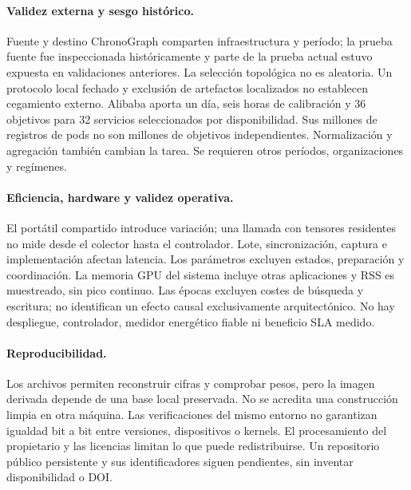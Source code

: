 \paragraph{Validez externa y sesgo histórico.} Fuente y destino ChronoGraph comparten infraestructura y período; la prueba fuente fue inspeccionada históricamente y parte de la prueba actual estuvo expuesta en validaciones anteriores. La selección topológica no es aleatoria. Un protocolo local fechado y exclusión de artefactos localizados no establecen cegamiento externo. Alibaba aporta un día, seis horas de calibración y 36 objetivos para 32 servicios seleccionados por disponibilidad. Sus millones de registros de pods no son millones de objetivos independientes. Normalización y agregación también cambian la tarea. Se requieren otros períodos, organizaciones y regímenes.

\paragraph{Eficiencia, hardware y validez operativa.} El portátil compartido introduce variación; una llamada con tensores residentes no mide desde el colector hasta el controlador. Lote, sincronización, captura e implementación afectan latencia. Los parámetros excluyen estados, preparación y coordinación. La memoria GPU del sistema incluye otras aplicaciones y RSS es muestreado, sin pico continuo. Las épocas excluyen costes de búsqueda y escritura; no identifican un efecto causal exclusivamente arquitectónico. No hay despliegue, controlador, medidor energético fiable ni beneficio SLA medido.

\paragraph{Reproducibilidad.} Los archivos permiten reconstruir cifras y comprobar pesos, pero la imagen derivada depende de una base local preservada. No se acredita una construcción limpia en otra máquina. Las verificaciones del mismo entorno no garantizan igualdad bit a bit entre versiones, dispositivos o kernels. El procesamiento del propietario y las licencias limitan lo que puede redistribuirse. Un repositorio público persistente y sus identificadores siguen pendientes, sin inventar disponibilidad o DOI.
